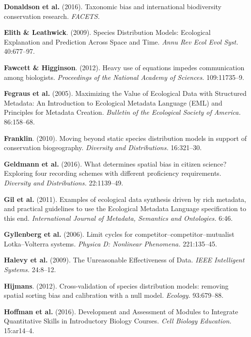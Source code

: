 \documentclass[11pt,serif]{article}
\begin{document}
\hypertarget{ref-DonBur16}{}
\textbf{Donaldson et al.} (2016). Taxonomic bias and international
biodiversity conservation research. \emph{FACETS.}

\hypertarget{ref-EliLea09}{}
\textbf{Elith \& Leathwick}. (2009). Species Distribution Models:
Ecological Explanation and Prediction Across Space and Time. \emph{Annu
Rev Ecol Evol Syst.} 40:677--97.

\hypertarget{ref-FawHig12}{}
\textbf{Fawcett \& Higginson}. (2012). Heavy use of equations impedes
communication among biologists. \emph{Proceedings of the National
Academy of Sciences.} 109:11735--9.

\hypertarget{ref-FegAnd05}{}
\textbf{Fegraus et al.} (2005). Maximizing the Value of Ecological Data
with Structured Metadata: An Introduction to Ecological Metadata
Language (EML) and Principles for Metadata Creation. \emph{Bulletin of
the Ecological Society of America.} 86:158--68.

\hypertarget{ref-Fra10a}{}
\textbf{Franklin}. (2010). Moving beyond static species distribution
models in support of conservation biogeography. \emph{Diversity and
Distributions.} 16:321--30.

\hypertarget{ref-GelHei16}{}
\textbf{Geldmann et al.} (2016). What determines spatial bias in citizen
science? Exploring four recording schemes with different proficiency
requirements. \emph{Diversity and Distributions.} 22:1139--49.

\hypertarget{ref-GilVan11}{}
\textbf{Gil et al.} (2011). Examples of ecological data synthesis driven
by rich metadata, and practical guidelines to use the Ecological
Metadata Language specification to this end. \emph{International Journal
of Metadata, Semantics and Ontologies.} 6:46.

\hypertarget{ref-GylYan06}{}
\textbf{Gyllenberg et al.} (2006). Limit cycles for
competitor--competitor--mutualist Lotka--Volterra systems. \emph{Physica
D: Nonlinear Phenomena.} 221:135--45.

\hypertarget{ref-HalNor09}{}
\textbf{Halevy et al.} (2009). The Unreasonable Effectiveness of Data.
\emph{IEEE Intelligent Systems.} 24:8--12.

\hypertarget{ref-Hij12}{}
\textbf{Hijmans}. (2012). Cross-validation of species distribution
models: removing spatial sorting bias and calibration with a null model.
\emph{Ecology.} 93:679--88.

\hypertarget{ref-HofLeu16}{}
\textbf{Hoffman et al.} (2016). Development and Assessment of Modules to
Integrate Quantitative Skills in Introductory Biology Courses.
\emph{Cell Biology Education.} 15:ar14--4.
\end{document}
